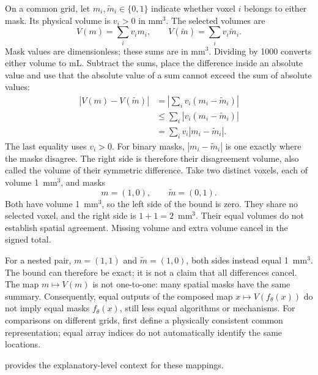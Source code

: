 On a common grid, let $m_i,\tilde m_i\in\{0,1\}$ indicate whether voxel $i$ belongs to either mask. Its physical volume is $v_i>0$ in mm$^3$. The selected volumes are
\[
V(m)=\sum_i v_i m_i,\qquad V(\tilde m)=\sum_i v_i\tilde m_i.
\]
Mask values are dimensionless; these sums are in mm$^3$. Dividing by 1000 converts either volume to mL.
Subtract the sums, place the difference inside an absolute value and use that the absolute value of a sum cannot exceed the sum of absolute values:
\[
\begin{aligned}
|V(m)-V(\tilde m)|
&=\left|\sum_i v_i(m_i-\tilde m_i)\right|\\
&\leq\sum_i|v_i(m_i-\tilde m_i)|\\
&=\sum_i v_i|m_i-\tilde m_i|.
\end{aligned}
\]
The last equality uses $v_i>0$. For binary masks, $|m_i-\tilde m_i|$ is one exactly where the masks disagree. The right side is therefore their disagreement volume, also called the volume of their symmetric difference.
Take two distinct voxels, each of volume 1~mm$^3$, and masks
\[
m=(1,0),\qquad\tilde m=(0,1).
\]
Both have volume 1~mm$^3$, so the left side of the bound is zero. They share no selected voxel, and the right side is $1+1=2$~mm$^3$. Their equal volumes do not establish spatial agreement. Missing volume and extra volume cancel in the signed total.

For a nested pair, $m=(1,1)$ and $\tilde m=(1,0)$, both sides instead equal 1~mm$^3$. The bound can therefore be exact; it is not a claim that all differences cancel.
The map $m\mapsto V(m)$ is not one-to-one: many spatial masks have the same summary. Consequently, equal outputs of the composed map $x\mapsto V(f_\theta(x))$ do not imply equal masks $f_\theta(x)$, still less equal algorithms or mechanisms. For comparisons on different grids, first define a physically consistent common representation; equal array indices do not automatically identify the same locations.

 provides the explanatory-level context for these mappings.

